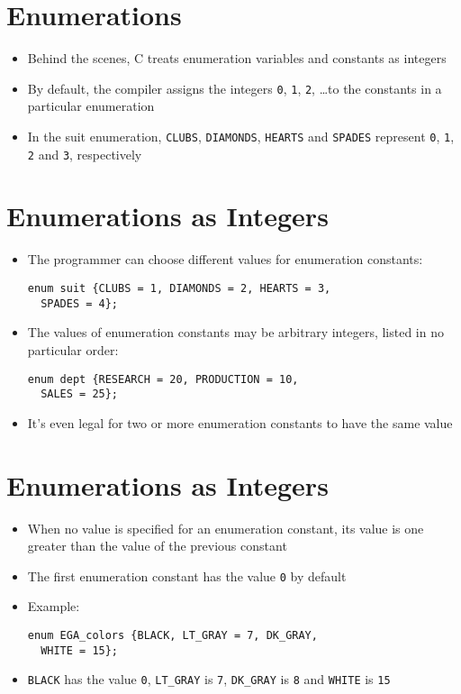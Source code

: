 \documentclass{article}
\begin{document}
\section{Enumerations}
\begin{itemize}
\item Behind the scenes, C treats enumeration variables and constants as integers

\item By default, the compiler assigns the integers \verb!0!, \verb!1!, \verb!2!, \ldots to the constants in a particular enumeration

\item In the suit enumeration, \verb!CLUBS!, \verb!DIAMONDS!, \verb!HEARTS! and \verb!SPADES! represent \verb!0!, \verb!1!, \verb!2! and \verb!3!, respectively
\end{itemize}



\section{Enumerations as Integers}
\begin{itemize}
\item The programmer can choose different values for enumeration constants:
\begin{verbatim}
enum suit {CLUBS = 1, DIAMONDS = 2, HEARTS = 3,
  SPADES = 4};
\end{verbatim}

\item The values of enumeration constants may be arbitrary integers, listed in no particular order:
\begin{verbatim}
enum dept {RESEARCH = 20, PRODUCTION = 10,
  SALES = 25};
\end{verbatim}

\item It's even legal for two or more enumeration constants to have the same value
\end{itemize}



\section{Enumerations as Integers}
\begin{itemize}
\item When no value is specified for an enumeration constant, its value is one greater than the value of the previous constant
\item The first enumeration constant has the value \verb!0! by default

\item Example:
\begin{verbatim}
enum EGA_colors {BLACK, LT_GRAY = 7, DK_GRAY,
  WHITE = 15};
\end{verbatim}
\item \verb!BLACK! has the value \verb!0!, \verb!LT_GRAY! is \verb!7!, \verb!DK_GRAY! is \verb!8! and \verb!WHITE! is \verb!15!
\end{itemize}
\end{document}
